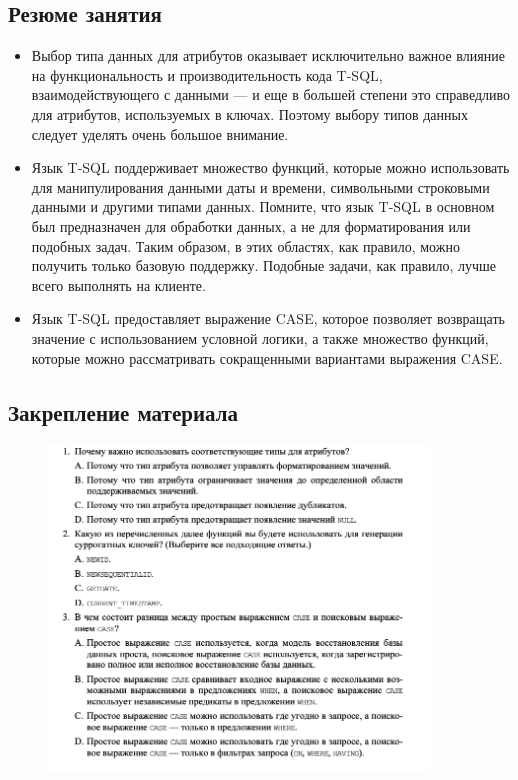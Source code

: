 \subsection*{Резюме занятия}
\begin{itemize}
	\item Выбор типа данных для атрибутов оказывает исключительно важное влияние на
	функциональность и производительность кода T-SQL, взаимодействующего
	с данными — и еще в большей степени это справедливо для атрибутов, используемых в ключах. Поэтому выбору типов данных следует уделять очень большое внимание.
	\item Язык T-SQL поддерживает множество функций, которые можно использовать
	для манипулирования данными даты и времени, символьными строковыми данными и другими типами данных. Помните, что язык T-SQL в основном был
	предназначен для обработки данных, а не для форматирования или подобных
	задач. Таким образом, в этих областях, как правило, можно получить только
	базовую поддержку. Подобные задачи, как правило, лучше всего выполнять на
	клиенте. 
	\item Язык T-SQL предоставляет выражение CASE, которое позволяет возвращать значение с использованием условной логики, а также множество функций, которые можно рассматривать сокращенными вариантами выражения CASE. 
\end{itemize}


\subsection*{Закрепление материала}

\begin{figure}[h!]
	\begin{center}
		\includegraphics[width=0.9\textwidth]{img/zakrep4.png}
	\end{center}
	\captionsetup{justification=centering}
\end{figure}

